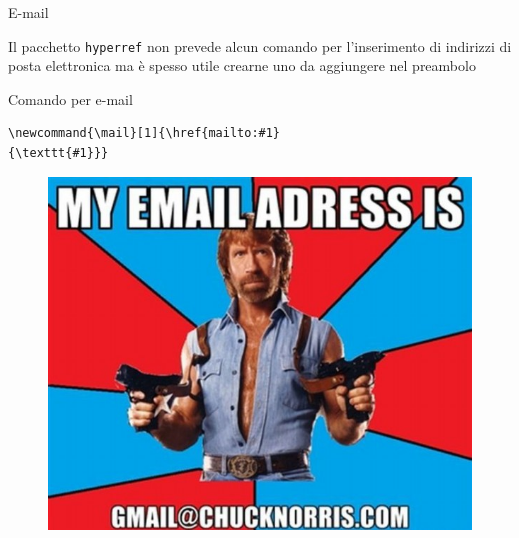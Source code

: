 \begin{frame}[fragile]{E-mail}

Il pacchetto \texttt{hyperref} non prevede alcun comando per l'inserimento di
indirizzi di posta elettronica ma è spesso utile crearne uno da aggiungere nel
preambolo

\begin{esempio}{Comando per e-mail}
	\begin{code}
\begin{verbatim}
\newcommand{\mail}[1]{\href{mailto:#1}
{\texttt{#1}}}
	\end{verbatim}
\end{code}
\end{esempio}

\begin{figure}
	\hspace*{-7cm} 
	\includegraphics[scale=0.25]{res/images/email}
\end{figure}

\end{frame}